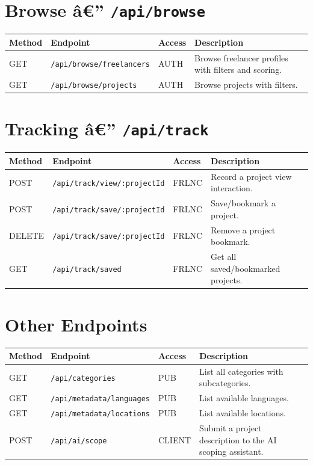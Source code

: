 \section*{Browse â€” \texttt{/api/browse}}

\begin{longtable}{p{1.5cm} p{5.5cm} p{1.5cm} p{5.5cm}}
\toprule
\textbf{Method} & \textbf{Endpoint} & \textbf{Access} & \textbf{Description} \\
\midrule
\endhead
\bottomrule
\endfoot
GET  & \texttt{/api/browse/freelancers}  & AUTH & Browse freelancer profiles with filters and scoring. \\
GET  & \texttt{/api/browse/projects}     & AUTH & Browse projects with filters. \\
\end{longtable}

\section*{Tracking â€” \texttt{/api/track}}

\begin{longtable}{p{1.5cm} p{5.5cm} p{1.5cm} p{5.5cm}}
\toprule
\textbf{Method} & \textbf{Endpoint} & \textbf{Access} & \textbf{Description} \\
\midrule
\endhead
\bottomrule
\endfoot
POST   & \texttt{/api/track/view/:projectId}     & FRLNC & Record a project view interaction. \\
POST   & \texttt{/api/track/save/:projectId}     & FRLNC & Save/bookmark a project. \\
DELETE & \texttt{/api/track/save/:projectId}     & FRLNC & Remove a project bookmark. \\
GET    & \texttt{/api/track/saved}               & FRLNC & Get all saved/bookmarked projects. \\
\end{longtable}

\section*{Other Endpoints}

\begin{longtable}{p{1.5cm} p{5.5cm} p{1.5cm} p{5.5cm}}
\toprule
\textbf{Method} & \textbf{Endpoint} & \textbf{Access} & \textbf{Description} \\
\midrule
\endhead
\bottomrule
\endfoot
GET  & \texttt{/api/categories}          & PUB   & List all categories with subcategories. \\
GET  & \texttt{/api/metadata/languages}  & PUB   & List available languages. \\
GET  & \texttt{/api/metadata/locations}  & PUB   & List available locations. \\
POST & \texttt{/api/ai/scope}            & CLIENT & Submit a project description to the AI scoping assistant. \\
\end{longtable}

